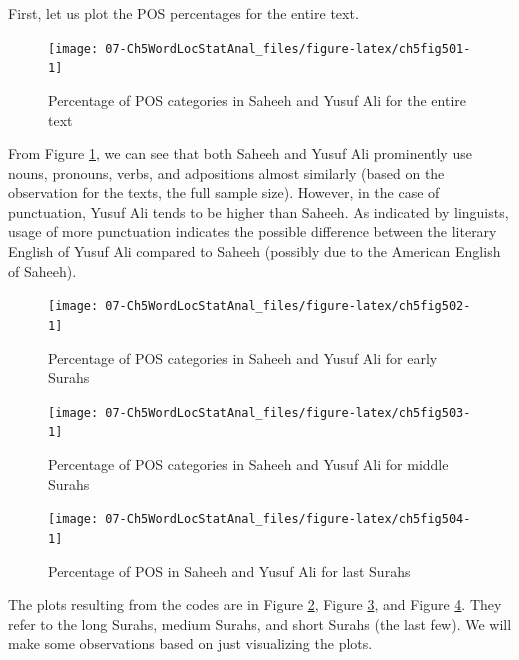 \documentclass[
]{article}
\begin{document}
\normalsize

First, let us plot the POS percentages for the entire text.

\begin{figure}

{\centering \texttt{[image: 07-Ch5WordLocStatAnal\_files/figure-latex/ch5fig501-1]} 

}

\caption{Percentage of POS categories in Saheeh and Yusuf Ali for the entire text}\label{fig:ch5fig501}
\end{figure}

From Figure \ref{fig:ch5fig501}, we can see that both Saheeh and Yusuf Ali prominently use nouns, pronouns, verbs, and adpositions almost similarly (based on the observation for the texts, the full sample size). However, in the case of punctuation, Yusuf Ali tends to be higher than Saheeh. As indicated by linguists, usage of more punctuation indicates the possible difference between the literary English of Yusuf Ali compared to Saheeh (possibly due to the American English of Saheeh).

\begin{figure}

{\centering \texttt{[image: 07-Ch5WordLocStatAnal\_files/figure-latex/ch5fig502-1]} 

}

\caption{Percentage of POS categories in Saheeh and Yusuf Ali for early Surahs}\label{fig:ch5fig502}
\end{figure}

\begin{figure}

{\centering \texttt{[image: 07-Ch5WordLocStatAnal\_files/figure-latex/ch5fig503-1]} 

}

\caption{Percentage of POS categories in Saheeh and Yusuf Ali for middle Surahs}\label{fig:ch5fig503}
\end{figure}

\begin{figure}

{\centering \texttt{[image: 07-Ch5WordLocStatAnal\_files/figure-latex/ch5fig504-1]} 

}

\caption{Percentage of POS in Saheeh and Yusuf Ali for last Surahs}\label{fig:ch5fig504}
\end{figure}

The plots resulting from the codes are in Figure \ref{fig:ch5fig502}, Figure \ref{fig:ch5fig503}, and Figure \ref{fig:ch5fig504}. They refer to the long Surahs, medium Surahs, and short Surahs (the last few). We will make some observations based on just visualizing the plots.
\end{document}
